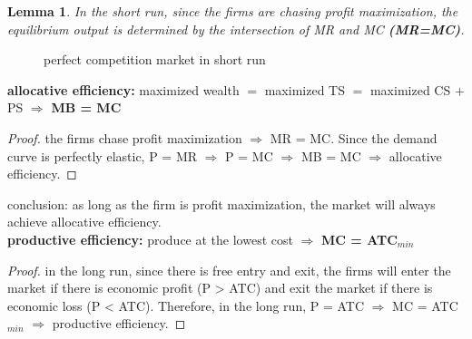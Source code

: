 \documentclass[UTF8]{article}
\newtheorem{lemma}{Lemma}
\begin{document}
\begin{lemma}
    In the short run, since the firms are chasing profit maximization, the equilibrium output is determined by the intersection of MR and MC \textbf{(MR=MC)}.
\end{lemma}

\begin{figure}[!h]
    \centering
{}
\caption{perfect competition market in short run}
\end{figure}

\textbf{allocative efficiency:} maximized wealth $=$ maximized TS $=$ maximized CS $+$ PS $\Longrightarrow$ \textbf{MB = MC}

\begin{proof}
    the firms chase profit maximization $\Longrightarrow$ MR = MC. Since the demand curve is perfectly elastic, P = MR $\Longrightarrow$ P = MC $\Longrightarrow$ MB = MC $\Longrightarrow$ allocative efficiency.
\end{proof}

conclusion: as long as the firm is profit maximization, the market will always achieve allocative efficiency.\\


\textbf{productive efficiency:} produce at the lowest cost $\Longrightarrow$ \textbf{MC = ATC$_{min}$}

\begin{proof}
    in the long run, since there is free entry and exit, the firms will enter the market if there is economic profit (P > ATC) and exit the market if there is economic loss (P < ATC). Therefore, in the long run, P = ATC $\Longrightarrow$ MC = ATC$_{min}$ $\Longrightarrow$ productive efficiency.
\end{proof}
\end{document}
